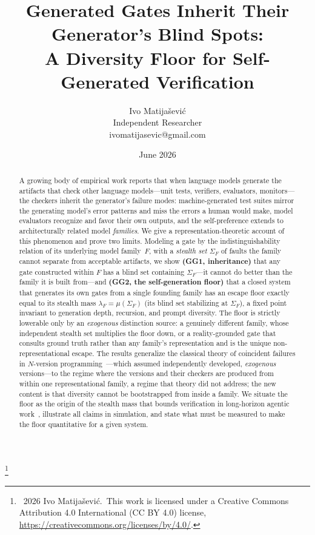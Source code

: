 \documentclass[11pt]{article}
\title{\vspace{-2em}Generated Gates Inherit Their Generator's Blind Spots:\\
\large A Diversity Floor for Self-Generated Verification}
\author{Ivo Matijašević\\ \small Independent Researcher \\ \small ivomatijasevic@gmail.com}
\date{June 2026}
\theoremstyle{definition}
\theoremstyle{remark}
\newcommand{\SigF}{\Sigma_{F}}
\newcommand{\lF}{\lambda_{F}}
\newcommand\blfootnote[1]{\begingroup\renewcommand\thefootnote{}\footnote{#1}\addtocounter{footnote}{-1}\endgroup}
\begin{document}
\maketitle
\blfootnote{\textcopyright~2026 Ivo Matijašević.\ This work is licensed under a Creative Commons
Attribution 4.0 International (CC BY 4.0) license, \url{https://creativecommons.org/licenses/by/4.0/}.}

\begin{abstract}
A growing body of empirical work reports that when language models generate the artifacts that
check other language models---unit tests, verifiers, evaluators, monitors---the checkers inherit the
generator's failure modes: machine-generated test suites mirror the generating model's error
patterns and miss the errors a human would make, model evaluators recognize and favor their own
outputs, and the self-preference extends to architecturally related model \emph{families}. We give a
representation-theoretic account of this phenomenon and prove two limits. Modeling a gate by the
indistinguishability relation of its underlying model family~$F$, with a \emph{stealth set} $\SigF$
of faults the family cannot separate from acceptable artifacts, we show \textbf{(GG1, inheritance)}
that any gate constructed within $F$ has a blind set containing $\SigF$---it cannot do better than
the family it is built from---and \textbf{(GG2, the self-generation floor)} that a closed system that
generates its own gates from a single founding family has an escape floor exactly equal to its
stealth mass $\lF=\mu(\SigF)$ (its blind set stabilizing at $\SigF$), a fixed point invariant to
generation depth, recursion, and prompt diversity. The floor is strictly
lowerable only by an \emph{exogenous} distinction source: a genuinely different family, whose
independent stealth set multiplies the floor down, or a reality-grounded gate that consults ground
truth rather than any family's representation and is the unique non-representational escape. The
results generalize the classical theory of coincident failures in $N$-version
programming~\cite{eckhardt1985,littlewood1989}---which assumed independently developed,
\emph{exogenous} versions---to the regime where the versions and their checkers are produced from
within one representational family, a regime that theory did not address; the new content is that
diversity cannot be bootstrapped from inside a family. We situate the floor as the origin of the
stealth mass that bounds verification in long-horizon agentic
work~\cite{matijasevic2026}, illustrate all claims in simulation, and state what must be measured to
make the floor quantitative for a given system.
\end{abstract}
\end{document}

